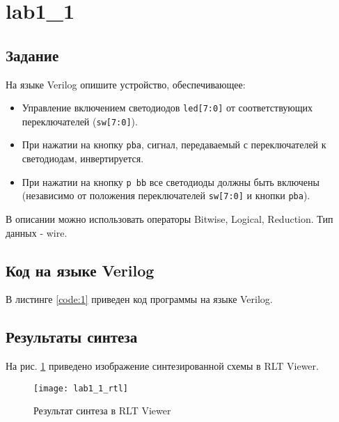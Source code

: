 





\tableofcontents
\newpage
\listoffigures
\lstlistoflistings
\newpage

\section{lab1\_1}

\subsection{Задание}

На языке Verilog опишите устройство, обеспечивающее:
\begin{itemize}
	\item Управление включением светодиодов \verb|led[7:0]| от соответствующих переключателей (\verb|sw[7:0]|).
	\item При нажатии на кнопку \verb|pba|, сигнал, передаваемый с переключателей к светодиодам, инвертируется.
	\item При нажатии на кнопку \verb|p	bb| все светодиоды должны быть включены (независимо от положения переключателей \verb|sw[7:0]| и кнопки \verb|pba|).
\end{itemize}

В описании можно использовать операторы Bitwise, Logical, Reduction. Тип данных - wire.

\subsection{Код на языке Verilog}

В листинге \ref{code:1} приведен код программы на языке Verilog.



\newpage

\subsection{Результаты синтеза}

На рис. \ref{fig:lab1_1_rtl} приведено изображение синтезированной схемы в RLT Viewer.

\begin{figure}[H]
\begin{center}
	\texttt{[image: lab1\_1\_rtl]}
	\caption{Результат синтеза в RLT Viewer}
	\label{fig:lab1_1_rtl}
\end{center}
\end{figure}

